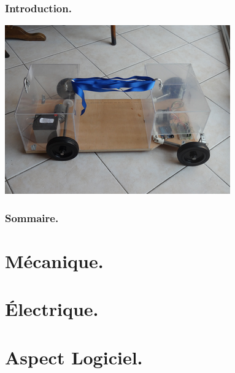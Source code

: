 \documentclass{beamer}
\title{}
\subtitle{PPE terminale}
\author[Luc \and Charles \and Arthur \and Lucas \and Patrice]{Luc Chabassier \and Charles Duhamel \and Arthur Sirech \and\\ Lucas Saliou \and Patrice Rey}
\institute{Lycée Pierre de Fermat}
\begin{document}
\begin{frame}
	\maketitle
\end{frame}

\begin{frame}
	\frametitle{Introduction.}
    \begin{center}
        \includegraphics[width=0.95\linewidth]{rcs/intro.png}
    \end{center}
\end{frame}

\begin{frame}
	\frametitle{Sommaire.}
	\tableofcontents
\end{frame}

\section{Mécanique.}


\section{Électrique.}


\section{Aspect Logiciel.}

\end{document}
